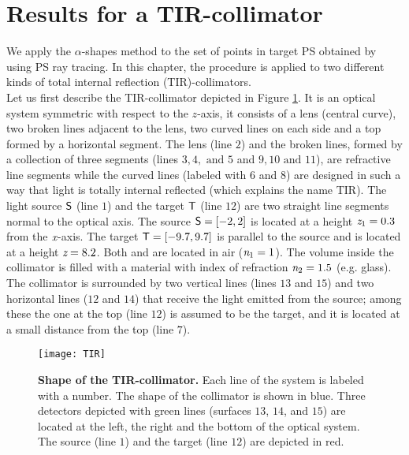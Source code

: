 \section{Results for a TIR-collimator}\label{sec:results-Tir-alpha}
We apply the $\alpha$-shapes method to the set of points in target PS obtained by using PS ray tracing.
In this chapter, the procedure is applied to two different kinds of total internal reflection (TIR)-collimators.\\ \indent  
Let us first describe the TIR-collimator depicted in Figure \ref{fig:tir}. It is an optical system symmetric with respect to the $z$-axis, it consists of a lens (central curve), two broken lines adjacent to the lens,
two curved lines on each side and a top formed by a horizontal segment. The lens (line $2$) and the broken lines, formed by a collection of three segments (lines $3, 4, \mbox{ and } 5$ and $9, 10 \mbox{ and } 11$), are refractive line segments while the curved lines (labeled with $6$ and $8$) are designed in such a way that light is totally internal reflected (which explains the name TIR).
The light source $\textsf{S}$ (line $1$) and the target $\textsf{T}$ (line $12$) are two straight line segments normal to the optical axis.
The source $\textsf{S}= [-2,2]$ is located at a height $\textit{z}_{1} = 0.3$ from the $\textit{x}$-axis.
 The target $\textsf{T}= [-9.7, 9.7]$ is parallel to the source and is located at a height $ \textit{z}= 8.2$. Both  and  are located in air ($\textit{n}_1=1$).
The volume inside the collimator is filled with a material with index of refraction $\textit{n}_2=1.5$ (e.g. glass).
The collimator is surrounded by two vertical lines (lines $13$ and $15$) and two horizontal lines ($12$ and $14$) that receive the light emitted from the source; among these the one at the top (line $12$) is assumed to be the target, and it is located at a small distance from the top (line $7$). 
\begin{figure}[t]
  \begin{center}
  \texttt{[image: TIR]}
  \end{center}
  \caption{\textbf{Shape of the TIR-collimator.} Each line of the system is labeled with a number.
   The shape of the collimator is shown in blue.
   Three detectors depicted with green lines (surfaces $13$, $14$, and $15$) are located at the left, the right and the bottom of the optical system. The source (line $1$) and the target (line $12$) are depicted in red.}
  \label{fig:tir}
\end{figure}
